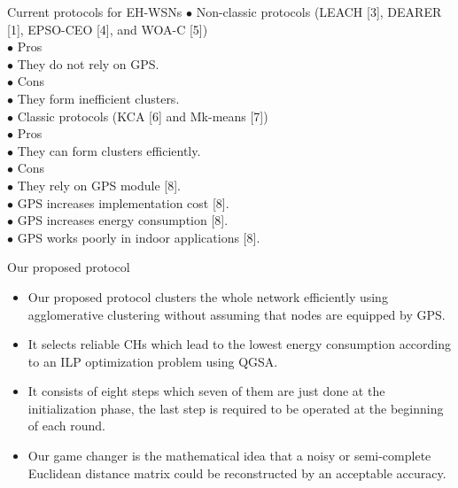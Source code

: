 \documentclass{beamer}
\begin{document}
\begin{frame}[t]{Current protocols for EH-WSNs} %
\small
\quad $\bullet$ Non-classic protocols (LEACH [3], DEARER [1], EPSO-CEO [4], and WOA-C [5])\\
\quad \quad $\bullet$ Pros	\\
\quad \quad \quad	$\bullet$ {\color{green} They do not rely on GPS.}	\\
\quad \quad $\bullet$ Cons \\
\quad \quad \quad $\bullet$ {\color{red} They form inefficient clusters.} \\
\quad $\bullet$ Classic protocols (KCA [6] and Mk-means [7])\\
\quad \quad $\bullet$ Pros	\\
\quad \quad \quad	$\bullet$ {\color{green} They can form clusters efficiently.}	\\
\quad \quad $\bullet$ Cons \\
\quad \quad \quad $\bullet$ {\color{red} They rely on GPS module [8].} \\
\quad \quad \quad \quad $\bullet$ {\color{red} GPS increases implementation cost [8].}\\
\quad \quad \quad \quad $\bullet$ {\color{red} GPS increases energy consumption [8].}\\
\quad \quad \quad \quad $\bullet$ {\color{red} GPS works poorly in indoor applications [8].}\\
\end{frame}

\begin{frame}[t]{Our proposed protocol} %
\small
\begin{itemize}
\justifying
\item {\color{green} Our proposed protocol clusters the whole network efficiently using agglomerative clustering without assuming that nodes are equipped by GPS.}
\item {\color{green} It selects reliable CHs which lead to the lowest energy consumption according to an ILP optimization problem using QGSA.} 
\item It consists of eight steps which seven of them are just done at the initialization phase, the last step is required to be operated at the beginning of each round.
\item Our game changer is the mathematical idea that a noisy or semi-complete Euclidean distance matrix could be reconstructed by an acceptable accuracy.
\end{itemize}
\end{frame}
\end{document}
